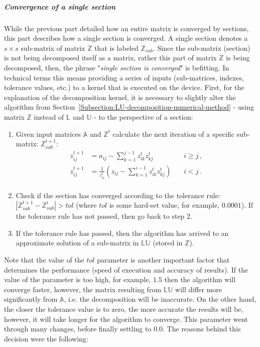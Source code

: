\subparagraph{Convergence of a single section}\label{Subparagraph:implementation-decomposition-project-lu-decomposition-iterative-crout-method-convergence-of-single-section}
While the previous part detailed how an entire matrix is converged by sections, this part describes how a single section is converged. A single section denotes a $ s\times s $ sub-matrix of matrix $ \mathbb{Z} $ that is labeled $ \mathbb{Z}_{sub} $. Since the sub-matrix (section) is not being decomposed itself as a matrix, rather this part of matrix $ \mathbb{Z} $ is being decomposed, then, the phrase "\textit{single section is converged}" is befitting. In technical terms this means providing a series of inputs (sub-matrices, indexes, tolerance values, etc.) to a kernel that is executed on the device. First, for the explanation of the decomposition kernel, it is necessary to slightly alter the algorithm from Section~\ref{Subsection:LU-decomposition-numerical-method} - using matrix $ \mathbb{Z} $ instead of $ \mathbb{L} $ and $ \mathbb{U} $ - to the perspective of a section:

\begin{enumerate}
	\item Given input matrices $ \mathbb{A} $ and $ \mathbb{Z}^t $ calculate the next iteration of a specific sub-matrix: $ \mathbb{Z}^{t+1}_{sub} $:
		\begin{align}
			z_{ij}^{t+1} &= a_{ij} - \sum_{k=1}^{j-1}z_{ik}^{t}z_{kj}^{t}                                                              &\quad i \geq j \nonumber\,, \\
			z_{ij}^{t+1} &= \frac{1}{z_{ii}^{t}} \left ( z_{ij} - \sum_{k=1}^{i-1}z_{ik}^{t}z_{kj}^{t} \right ) &\quad i < j \nonumber\,.\\
		\end{align}
	\item Check if the section has converged according to the tolerance rule: $ \left | \mathbb{Z}^{t+1}_{sub} - \mathbb{Z}^{t}_{sub} \right | > tol $ (where $ tol $ is some hard-set value, for example, $ 0.0001 $). If the tolerance rule has not passed, then go back to step 2.
	\item If the tolerance rule has passed, then the algorithm has arrived to an approximate solution of a sub-matrix in $ \mathbb{L}\mathbb{U} $ (stored in $ \mathbb{Z} $).
\end{enumerate}

Note that the value of the $ tol $ parameter is another important factor that determines the performance (speed of execution and accuracy of results). If the value of the parameter is too high, for example, $ 1.5 $ then the algorithm will converge faster, however, the matrix resulting from $ \mathbb{L}\mathbb{U} $ will differ more significantly from $ \mathbb{A} $, i.e. the decomposition will be inaccurate. On the other hand, the closer the tolerance value is to zero, the more accurate the results will be, however, it will take longer for the algorithm to converge. This parameter went through many changes, before finally settling to $ 0.0 $. The reasons behind this decision were the following:

